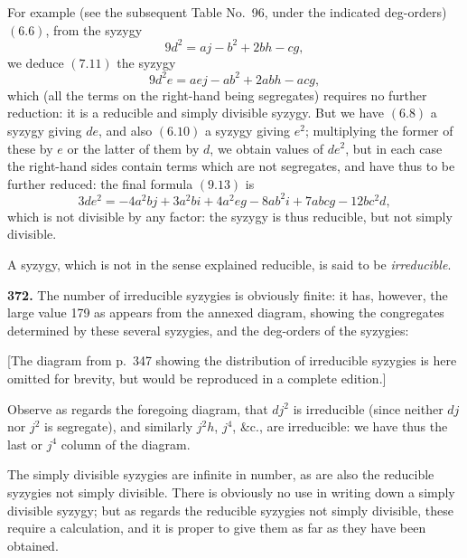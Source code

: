 \documentclass[11pt,a4paper]{book}
\begin{document}
For example (see the subsequent Table No.~96, under the indicated deg-orders) $(6.6)$, from the syzygy
\[
9d^2 = aj - b^2 + 2bh - cg,
\]
we deduce $(7.11)$ the syzygy
\[
9d^2 e = ae j - ab^2 + 2abh - acg,
\]
which (all the terms on the right-hand being segregates) requires no further reduction: it is a reducible and simply divisible syzygy. But we have $(6.8)$ a syzygy giving $de$, and also $(6.10)$ a syzygy giving $e^2$; multiplying the former of these by $e$ or the latter of them by $d$, we obtain values of $de^2$, but in each case the right-hand sides contain terms which are not segregates, and have thus to be further reduced: the final formula $(9.13)$ is
\[
3de^2 = -4a^2 bj + 3a^2 bi + 4a^2 eg - 8ab^2 i + 7abcg - 12bc^2 d,
\]
which is not divisible by any factor: the syzygy is thus reducible, but not simply divisible.

A syzygy, which is not in the sense explained reducible, is said to be \textit{irreducible}.

\medskip

\noindent\textbf{372.} The number of irreducible syzygies is obviously finite: it has, however, the large value 179 as appears from the annexed diagram, showing the congregates determined by these several syzygies, and the deg-orders of the syzygies:

[The diagram from p.\ 347 showing the distribution of irreducible syzygies is here omitted for brevity, but would be reproduced in a complete edition.]

Observe as regards the foregoing diagram, that $dj^2$ is irreducible (since neither $dj$ nor $j^2$ is segregate), and similarly $j^2 h$, $j^4$, \&c., are irreducible: we have thus the last or $j^4$ column of the diagram.

The simply divisible syzygies are infinite in number, as are also the reducible syzygies not simply divisible. There is obviously no use in writing down a simply divisible syzygy; but as regards the reducible syzygies not simply divisible, these require a calculation, and it is proper to give them as far as they have been obtained.

\medskip
\end{document}
